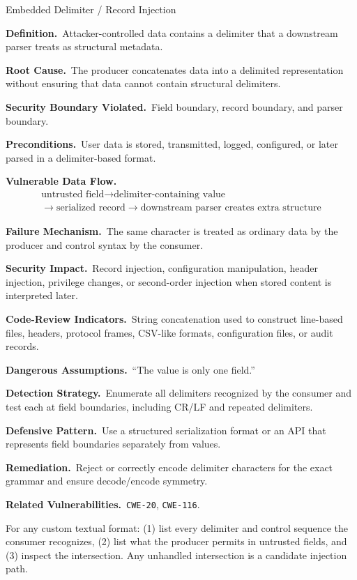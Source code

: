 \documentclass[11pt]{article}
\newcommand{\field}[1]{\par\smallskip\noindent\textbf{#1.}\ }
\newcommand{\cwe}[1]{\texttt{#1}}
\begin{document}
\begin{catalogbox}{Embedded Delimiter / Record Injection}
\field{Definition}Attacker-controlled data contains a delimiter that a downstream parser treats as structural metadata.

\field{Root Cause}The producer concatenates data into a delimited representation without ensuring that data cannot contain structural delimiters.

\field{Security Boundary Violated}Field boundary, record boundary, and parser boundary.

\field{Preconditions}User data is stored, transmitted, logged, configured, or later parsed in a delimiter-based format.

\field{Vulnerable Data Flow}
\[
\begin{gathered}
\text{untrusted field} \rightarrow \text{delimiter-containing value} \\
\rightarrow \text{serialized record} \rightarrow \text{downstream parser creates extra structure}
\end{gathered}
\]

\field{Failure Mechanism}The same character is treated as ordinary data by the producer and control syntax by the consumer.

\field{Security Impact}Record injection, configuration manipulation, header injection, privilege changes, or second-order injection when stored content is interpreted later.

\field{Code-Review Indicators}String concatenation used to construct line-based files, headers, protocol frames, CSV-like formats, configuration files, or audit records.

\field{Dangerous Assumptions}``The value is only one field.''

\field{Detection Strategy}Enumerate all delimiters recognized by the consumer and test each at field boundaries, including CR/LF and repeated delimiters.

\field{Defensive Pattern}Use a structured serialization format or an API that represents field boundaries separately from values.

\field{Remediation}Reject or correctly encode delimiter characters for the exact grammar and ensure decode/encode symmetry.

\field{Related Vulnerabilities}\cwe{CWE-20}, \cwe{CWE-116}.
\end{catalogbox}

\begin{auditheuristic}
For any custom textual format: (1) list every delimiter and control sequence the consumer recognizes, (2) list what the producer permits in untrusted fields, and (3) inspect the intersection. Any unhandled intersection is a candidate injection path.
\end{auditheuristic}
\clearpage
\end{document}

